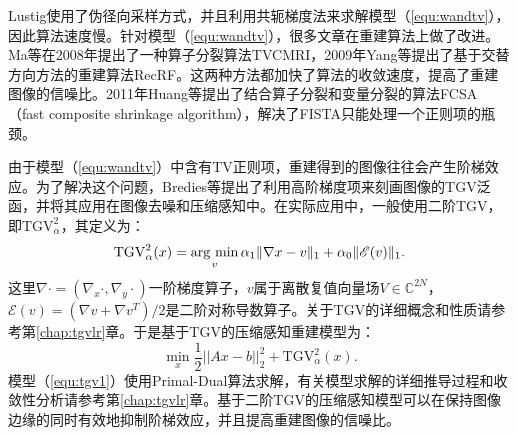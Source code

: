 Lustig使用了伪径向采样方式，并且利用共轭梯度法来求解模型（\ref{equ:wandtv}），因此算法速度慢。针对模型（\ref{equ:wandtv}），很多文章在重建算法上做了改进。Ma等在2008年提出了一种算子分裂算法TVCMRI\cite{tvcmri}，2009年Yang等提出了基于交替方向方法的重建算法RecRF\cite{Yang2010A}。这两种方法都加快了算法的收敛速度，提高了重建图像的信噪比。2011年Huang\cite{Huang2011Efficient}等提出了结合算子分裂和变量分裂的算法FCSA（fast composite shrinkage algorithm），解决了FISTA只能处理一个正则项的瓶颈。

由于模型（\ref{equ:wandtv}）中含有TV正则项，重建得到的图像往往会产生阶梯效应。为了解决这个问题，Bredies等\cite{bredies2010total}提出了利用高阶梯度项来刻画图像的TGV泛函，并将其应用在图像去噪\cite{infimaltgv}和压缩感知\cite{tgv}中。在实际应用中，一般使用二阶TGV，即$\mathrm{TGV}_{\alpha}^2$，其定义为：
$$\mathrm{TGV}_\alpha^2(x)=\argmin_v \alpha_1\|\nabla x-v\|_1+\alpha_0\|\mathscr{E}(v)\|_1.$$
这里$\nabla \cdot=(\nabla_x \cdot, \nabla_y \cdot)$一阶梯度算子，$v$属于离散复值向量场$V\in \mathbb{C}^{2N}$，$\mathscr{E}(v)=(\nabla v+\nabla v^T)/2$是二阶对称导数算子。关于TGV的详细概念和性质请参考第\ref{chap:tgvlr}章。于是基于TGV的压缩感知重建模型为：
\begin{equation}
	\min_x\frac{1}{2}||Ax-b||^2_2 + \mathrm{TGV}_{\alpha}^2(x).
	\label{equ:tgv1}
\end{equation}
模型（\ref{equ:tgv1}）使用Primal-Dual算法求解，有关模型求解的详细推导过程和收敛性分析请参考第\ref{chap:tgvlr}章。基于二阶TGV的压缩感知模型可以在保持图像边缘的同时有效地抑制阶梯效应，并且提高重建图像的信噪比。

